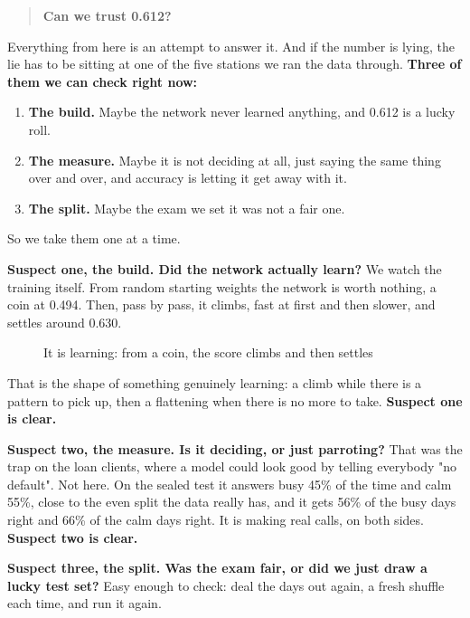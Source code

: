 \documentclass[11pt]{article} %
\begin{document}
\begin{quote}
\textbf{Can we trust 0.612?}
\end{quote}


Everything from here is an attempt to answer it. And if the number is lying, the lie has to be sitting at one of the five stations we ran the data through. \textbf{Three of them we can check right now:}

\begin{enumerate}
\item \textbf{The build.} Maybe the network never learned anything, and 0.612 is a lucky roll.
\item \textbf{The measure.} Maybe it is not deciding at all, just saying the same thing over and over, and accuracy is letting it get away with it.
\item \textbf{The split.} Maybe the exam we set it was not a fair one.
\end{enumerate}


So we take them one at a time.

\textbf{Suspect one, the build. Did the network actually learn?} We watch the training itself. From random starting weights the network is worth nothing, a coin at 0.494. Then, pass by pass, it climbs, fast at first and then slower, and settles around 0.630.

\begin{figure}[htbp]
\centering

\caption{It is learning: from a coin, the score climbs and then settles}
\end{figure}


That is the shape of something genuinely learning: a climb while there is a pattern to pick up, then a flattening when there is no more to take. \textbf{Suspect one is clear.}

\textbf{Suspect two, the measure. Is it deciding, or just parroting?} That was the trap on the loan clients, where a model could look good by telling everybody "no default". Not here. On the sealed test it answers busy 45\% of the time and calm 55\%, close to the even split the data really has, and it gets 56\% of the busy days right and 66\% of the calm days right. It is making real calls, on both sides. \textbf{Suspect two is clear.}

\textbf{Suspect three, the split. Was the exam fair, or did we just draw a lucky test set?} Easy enough to check: deal the days out again, a fresh shuffle each time, and run it again.
\end{document}
